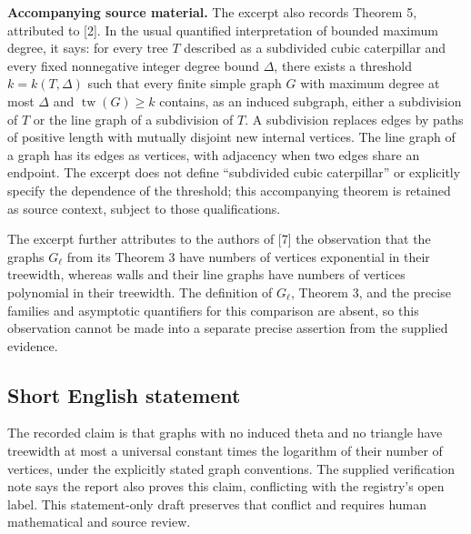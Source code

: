 \documentclass[11pt]{article}
\begin{document}
\textbf{Accompanying source material.} The excerpt also records Theorem 5, attributed to [2]. In the usual quantified interpretation of bounded maximum degree, it says: for every tree \(T\) described as a subdivided cubic caterpillar and every fixed nonnegative integer degree bound \(\Delta\), there exists a threshold \(k=k(T,\Delta)\) such that every finite simple graph \(G\) with maximum degree at most \(\Delta\) and \(\operatorname{tw}(G)\geq k\) contains, as an induced subgraph, either a subdivision of \(T\) or the line graph of a subdivision of \(T\). A subdivision replaces edges by paths of positive length with mutually disjoint new internal vertices. The line graph of a graph has its edges as vertices, with adjacency when two edges share an endpoint. The excerpt does not define ``subdivided cubic caterpillar'' or explicitly specify the dependence of the threshold; this accompanying theorem is retained as source context, subject to those qualifications.

The excerpt further attributes to the authors of [7] the observation that the graphs \(G_\ell\) from its Theorem 3 have numbers of vertices exponential in their treewidth, whereas walls and their line graphs have numbers of vertices polynomial in their treewidth. The definition of \(G_\ell\), Theorem 3, and the precise families and asymptotic quantifiers for this comparison are absent, so this observation cannot be made into a separate precise assertion from the supplied evidence.
\subsection{Short English statement}
The recorded claim is that graphs with no induced theta and no triangle have treewidth at most a universal constant times the logarithm of their number of vertices, under the explicitly stated graph conventions. The supplied verification note says the report also proves this claim, conflicting with the registry's open label. This statement-only draft preserves that conflict and requires human mathematical and source review.
\end{document}
